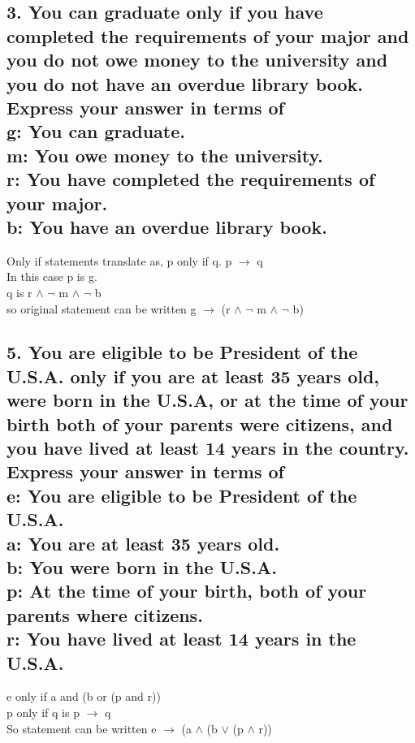 \documentclass[11pt, oneside]{article} %
\numberwithin{equation}{section} %
\numberwithin{figure}{section} %
\numberwithin{table}{section} %
\begin{document}
\subsection{3. You can graduate only if you have completed the requirements of your major and you do not owe money to the university and you do not have an overdue library book. Express your answer in terms of \\
g: You can graduate. \\
m: You owe money to the university. \\
r: You have completed the requirements of your major. \\
b: You have an overdue library book.} 
Only if statements translate as, p only if q. p $\rightarrow$ q \\
In this case p is g.\\
q is r  $\wedge$ $\neg$ m  $\wedge$ $\neg$ b \\
so original statement can be written g $\rightarrow$ (r  $\wedge$ $\neg$ m  $\wedge$ $\neg$ b)

\subsection{5. You are eligible to be President of the U.S.A. only if you are at least 35 years old, were born in the U.S.A, or at the time of your birth both of your parents were citizens, and you have lived at least 14 years in the country. Express your answer in terms of \\
e: You are eligible to be President of the U.S.A. \\
a: You are at least 35 years old.\\
b: You were born in the U.S.A. \\
p: At the time of your birth, both of your parents where citizens. \\
r: You have lived at least 14 years in the U.S.A.}
e only if a and (b or (p and r))\\
p only if q is p $\rightarrow$ q \\
So statement can be written e $\rightarrow$ (a  $\wedge$ (b $\vee$ (p $\wedge$ r))
\end{document}
